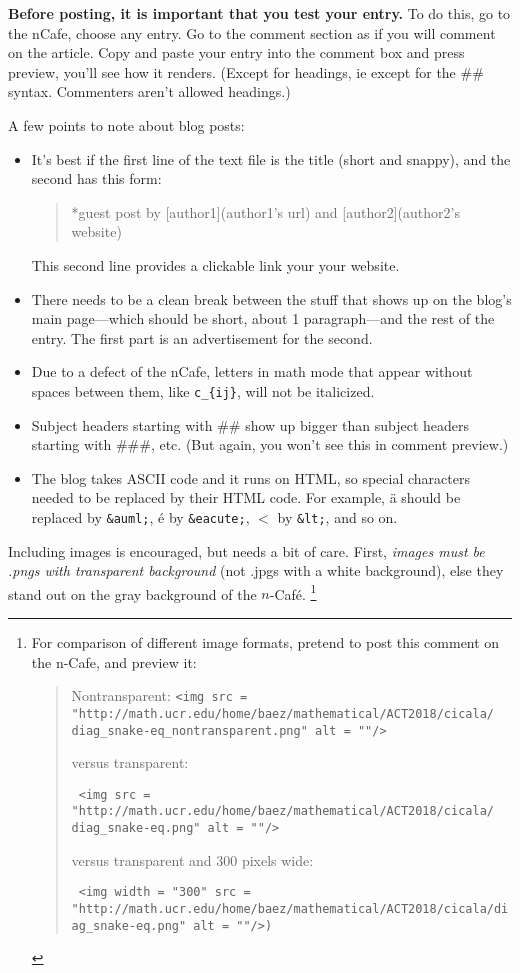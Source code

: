 \documentclass[11pt, oneside]{article}
\begin{document}
\textbf{Before posting, it is important that you test your
  entry.} To do this, go to the nCafe, choose any entry. Go
to the comment section as if you will comment on the
article. Copy and paste your entry into the comment box and
press preview, you'll see how it renders. (Except for
headings, ie except for the \#\# syntax. Commenters aren't
allowed headings.)


A few points to note about blog posts:
\begin{itemize}
  \item It's best if the first line of the text file is the
    title (short and snappy), and the second has this form:
    \begin{quote}
      *guest post by [author1](author1's url) and
      [author2](author2's website)
    \end{quote}
    This second line provides a clickable link your your
    website.

  \item There needs to be a clean break between the stuff
    that shows up on the blog's main page---which should be
    short, about 1 paragraph---and the rest of the entry.
    The first part is an advertisement for the second.

  \item Due to a defect of the nCafe, letters in math
    mode that appear without spaces between them, like
    \texttt{c\_\{ij\}}, will not be italicized.

  \item Subject headers starting with \#\# show up bigger
    than subject headers starting with \#\#\#, etc. (But
    again, you won't see this in comment preview.)
  \item The blog takes ASCII code and it runs on HTML, so
    special characters needed to be replaced by their HTML
    code. For example, \"a should be replaced by
    \texttt{\&auml;}, \'e by \texttt{\&eacute;}, $<$ by
    \texttt{\&lt;}, and so on.
\end{itemize}

Including images is encouraged, but needs a bit of
care. First, \emph{images must be .pngs with transparent
  background} (not .jpgs with a white background), else they
stand out on the gray background of the $n$-Caf\'e.
\footnote{
  For comparison of different image formats,
  pretend to post this comment on the n-Cafe, and preview
  it:
  \begin{quote}
    Nontransparent:
    \texttt{<img src = "http://math.ucr.edu/home/baez/mathematical/ACT2018/cicala/ diag\_snake-eq\_nontransparent.png"
      alt = ""/>}
    
    versus transparent:

    \texttt{
      <img src =
      "http://math.ucr.edu/home/baez/mathematical/ACT2018/cicala/ diag\_snake-eq.png"
      alt = ""/>}

    versus transparent and 300 pixels wide:

    \texttt{
      <img width = "300" src =
      "http://math.ucr.edu/home/baez/mathematical/ACT2018/cicala/diag\_snake-eq.png"
      alt = ""/>)}
  \end{quote}
}
\end{document}
